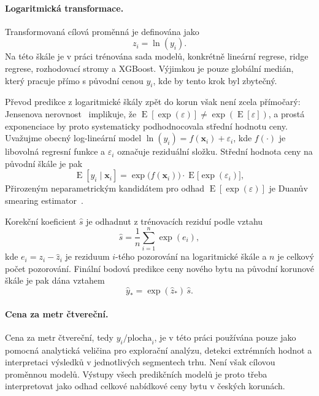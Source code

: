 \paragraph{Logaritmická transformace.}
Transformovaná cílová proměnná je definována jako
\begin{equation}
    z_i = \ln(y_i).
\end{equation}
Na této škále je v práci trénována sada modelů, konkrétně lineární regrese, ridge regrese, rozhodovací stromy a XGBoost. Výjimkou je pouze globální medián, který pracuje přímo s původní cenou \(y_i\), kde by tento krok byl zbytečný.

Převod predikce z logaritmické škály zpět do korun však není zcela přímočarý: Jensenova nerovnost~\cite{Jensen1906} implikuje, že \(\operatorname{E}[\exp(\varepsilon)] \neq \exp(\operatorname{E}[\varepsilon])\), a prostá exponenciace by proto systematicky podhodnocovala střední hodnotu ceny. Uvažujme obecný log-lineární model \(\ln(y_i) = f(\mathbf{x}_i) + \varepsilon_i\), kde \(f(\cdot)\) je libovolná regresní funkce a \(\varepsilon_i\) označuje reziduální složku. Střední hodnota ceny na původní škále je pak
\begin{equation}
    \operatorname{E}[y_i \mid \mathbf{x}_i] = \exp\!\bigl(f(\mathbf{x}_i)\bigr) \cdot \operatorname{E}\!\bigl[\exp(\varepsilon_i)\bigr],
\end{equation}
Přirozeným neparametrickým kandidátem pro odhad \(\operatorname{E}[\exp(\varepsilon)]\) je Duanův smearing estimator~\cite{Duan1983Smearing}.

Korekční koeficient \(\hat{s}\) je odhadnut z trénovacích reziduí podle vztahu
\begin{equation}
    \hat{s} = \frac{1}{n} \sum_{i=1}^{n} \exp(e_i),
\end{equation}
kde \(e_i = z_i - \hat{z}_i\) je reziduum \(i\)-tého pozorování na logaritmické škále a \(n\) je celkový počet pozorování. Finální bodová predikce ceny nového bytu na původní korunové škále je pak dána vztahem
\begin{equation}
    \hat{y}_* = \exp(\hat{z}_*)\,\hat{s}.
\end{equation}

\paragraph{Cena za metr čtvereční.}
Cena za metr čtvereční, tedy \(y_i / \text{plocha}_i\), je v této práci používána pouze jako pomocná analytická veličina pro explorační analýzu, detekci extrémních hodnot a interpretaci výsledků v jednotlivých segmentech trhu. Není však cílovou proměnnou modelů. Výstupy všech predikčních modelů je proto třeba interpretovat jako odhad celkové nabídkové ceny bytu v českých korunách.
